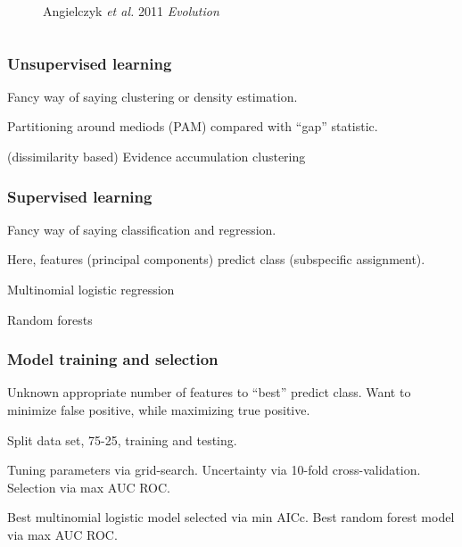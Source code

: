 \documentclass{beamer}\usepackage{graphicx, color}
\begin{document}
\begin{frame}
\begin{columns}
\begin{column}{0.5\textwidth}
\begin{figure}[h]
        \caption*{\scriptsize{Angielczyk \textit{et al.} 2011 \textit{Evolution}}}
        \label{fig:plast}
      \end{figure}
    \end{column}
  \end{columns}
\end{frame}

\begin{frame}
  \frametitle{Unsupervised learning}

  Fancy way of saying clustering or density estimation.

  Partitioning around mediods (PAM) compared with ``gap'' statistic.

  (dissimilarity based) Evidence accumulation clustering
\end{frame}

\begin{frame}
  \frametitle{Supervised learning}

  Fancy way of saying classification and regression.

  Here, features (principal components) predict class (subspecific assignment).

  Multinomial logistic regression

  Random forests
\end{frame}

\begin{frame}
  \frametitle{Model training and selection}
  Unknown appropriate number of features to ``best'' predict class. Want to minimize false positive, while maximizing true positive.

  Split data set, 75-25, training and testing.

  Tuning parameters via grid-search. Uncertainty via 10-fold cross-validation. Selection via max AUC ROC.

  Best multinomial logistic model selected via min AICc. Best random forest model via max AUC ROC.

\end{frame}
\end{document}
